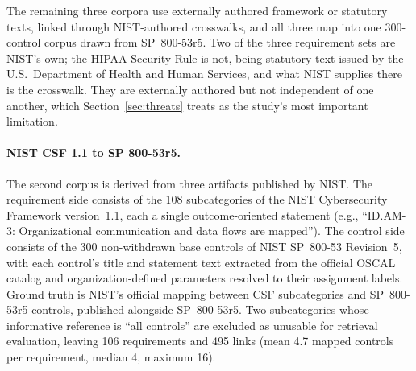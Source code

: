 \documentclass[a4paper,fleqn]{cas-sc}
\begin{document}
The remaining three corpora use externally authored framework or statutory texts, linked through NIST-authored crosswalks, and all three map into one 300-control corpus drawn from SP~800-53r5. Two of the three requirement sets are NIST's own; the HIPAA Security Rule is not, being statutory text issued by the U.S.\ Department of Health and Human Services, and what NIST supplies there is the crosswalk. They are externally authored but not independent of one another, which Section~\ref{sec:threats} treats as the study's most important limitation.

\paragraph{NIST CSF 1.1 to SP 800-53r5.}

The second corpus is derived from three artifacts published by NIST.
The requirement side consists of the 108 subcategories of the NIST Cybersecurity Framework version~1.1, each a single outcome-oriented statement (e.g., ``ID.AM-3: Organizational communication and data flows are mapped'').
The control side consists of the 300 non-withdrawn base controls of NIST SP~800-53 Revision~5, with each control's title and statement text extracted from the official OSCAL catalog and organization-defined parameters resolved to their assignment labels.
Ground truth is NIST's official mapping between CSF subcategories and SP~800-53r5 controls, published alongside SP~800-53r5.
Two subcategories whose informative reference is ``all controls'' are excluded as unusable for retrieval evaluation, leaving 106 requirements and 495 links (mean 4.7 mapped controls per requirement, median 4, maximum 16).
\end{document}
